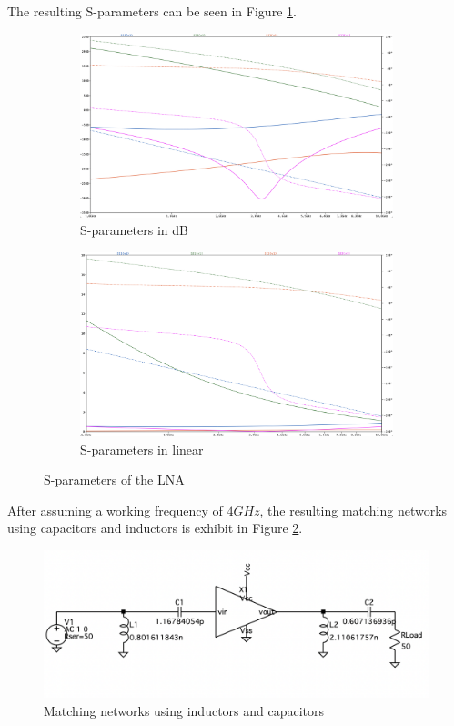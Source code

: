The resulting S-parameters can be seen in Figure \ref{fig:SimS-param}.

\begin{figure}[H]
    \centering
    \begin{subfigure}{0.4\textwidth}
        \includegraphics*[scale = 0.13]{Images/S-paramdB.png}
        \caption{S-parameters in dB}
    \end{subfigure}
    \hfill
    \begin{subfigure}{0.4\textwidth}
        \includegraphics*[scale = 0.13]{Images/S-paramLin.png}
        \caption{S-parameters in linear}
    \end{subfigure}
    \caption{S-parameters of the LNA}
    \label{fig:SimS-param}
\end{figure}

After assuming a working frequency of $4 GHz$, the resulting matching networks using capacitors and inductors is exhibit in Figure \ref{fig:SIMLCMatchingCircuit}.

\begin{figure}[H]
    \centering
    \includegraphics*[scale = 0.3]{Images/SIMLCmatchingcircuit.png}
    \caption{Matching networks using inductors and capacitors}
    \label{fig:SIMLCMatchingCircuit}
\end{figure}

